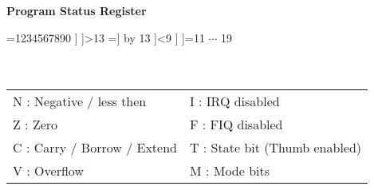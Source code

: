 \newcommand{\fakethirtytwobits}[1]{%
	\tiny
	\ifnum#1=1234567890
		#1
	\else
		\ifnum#1>13
			\count32=#1
			\advance\count32 by 13
			\the\count32%
		\else
			\ifnum#1<9
				#1%
			\else
				\ifnum#1=11
					$\cdots$%
				\fi
			\fi
		\fi
	\fi
}
\begin{minipage}{\textwidth}
\begin{framed}
	\begin{center}
		\textbf{Program Status Register}
	\end{center}
	\begin{bytefield}[bitwidth=17px,endianness=big,bitformatting=\fakethirtytwobits]{19}
	  \\
	 \\
	   \\
	\end{bytefield}
	\begin{tabular}{ll}
	N : Negative / less then & I : IRQ disabled \\
	Z : Zero & F : FIQ disabled \\
	C : Carry / Borrow / Extend & T : State bit (Thumb enabled)\\
	V : Overflow & M : Mode bits \\
	\end{tabular} \\
\end{framed}
\end{minipage}
